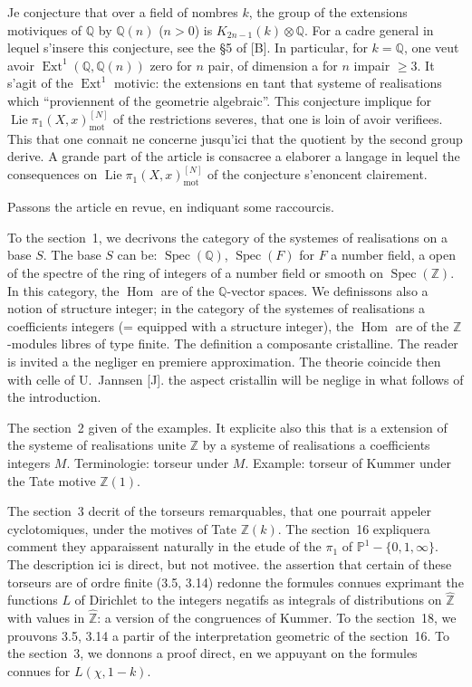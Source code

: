 \documentclass[12pt,a4paper]{article}
\theoremstyle{plain}
\theoremstyle{definition}
\theoremstyle{remark}
\DeclareMathOperator{\Spec}{Spec}
\DeclareMathOperator{\Hom}{Hom}
\DeclareMathOperator{\Ext}{Ext}
\DeclareMathOperator{\Lie}{Lie}
\newcommand{\mot}{\mathrm{mot}}
\providecommand{\Hom}{\operatorname{Hom}}
\providecommand{\Ext}{\operatorname{Ext}}
\providecommand{\Spec}{\operatorname{Spec}}
\providecommand{\mot}{\mathrm{mot}}
\providecommand{\Lie}{\operatorname{Lie}}
\begin{document}
Je conjecture that over a field of nombres $k$, the group of the extensions motiviques of
$\mathbb{Q}$ by $\mathbb{Q}(n)$ ($n > 0$) is $K_{2n-1}(k) \otimes \mathbb{Q}$. For a cadre
general in lequel s'insere this conjecture, see the \S5 of [B]. In particular, for
$k = \mathbb{Q}$, one veut avoir $\Ext^1(\mathbb{Q}, \mathbb{Q}(n))$ zero for $n$ pair, of dimension
a for $n$ impair $\geq 3$. It s'agit of the $\Ext^1$ motivic: the extensions en tant that
systeme of realisations which ``proviennent of the geometrie algebraic''. This conjecture
implique for $\Lie\pi_1(X,x)^{[N]}_{\mot}$ of the restrictions severes, that one is loin of avoir
verifiees. This that one connait ne concerne jusqu'ici that the quotient by the second group
derive. A grande part of the article is consacree a elaborer a langage in lequel
the consequences on $\Lie\pi_1(X,x)^{[N]}_{\mot}$ of the conjecture s'enoncent clairement.

Passons the article en revue, en indiquant some raccourcis.

To the section~1, we decrivons the category of the systemes of realisations on a
base $S$. The base $S$ can be: $\Spec(\mathbb{Q})$, $\Spec(F)$ for $F$ a number field,
a open of the spectre of the ring of integers of a number field or smooth on $\Spec(\mathbb{Z})$.
In this category, the $\Hom$ are of the $\mathbb{Q}$-vector spaces. We definissons also
a notion of structure integer; in the category of the systemes of realisations a
coefficients integers (= equipped with a structure integer), the $\Hom$ are of the $\mathbb{Z}$-modules
libres of type finite. The definition a composante cristalline. The reader is invited
a the negliger en premiere approximation. The theorie coincide then with celle of U.~Jannsen [J]. the aspect cristallin will be neglige in what follows of the introduction.

The section~2 given of the examples. It explicite also this that is a extension of the
systeme of realisations unite $\mathbb{Z}$ by a systeme of realisations a
coefficients integers $M$. Terminologie: torseur under $M$. Example: torseur of Kummer
under the Tate motive $\mathbb{Z}(1)$.

The section~3 decrit of the torseurs remarquables, that one pourrait appeler cyclotomiques,
under the motives of Tate $\mathbb{Z}(k)$. The section~16 expliquera comment they apparaissent
naturally in the etude of the $\pi_1$ of $\mathbb{P}^1 - \{0,1,\infty\}$. The description
ici is direct, but not motivee. the assertion that certain of these torseurs are of ordre
finite (3.5, 3.14) redonne the formules connues exprimant the functions $L$ of Dirichlet to the
integers negatifs as integrals of distributions on $\hat{\mathbb{Z}}$ with values in
$\hat{\mathbb{Z}}$: a version of the congruences of Kummer. To the section~18, we prouvons
3.5, 3.14 a partir of the interpretation geometric of the section~16. To the section~3,
we donnons a proof direct, en we appuyant on the formules connues for
$L(\chi, 1-k)$.
\end{document}
